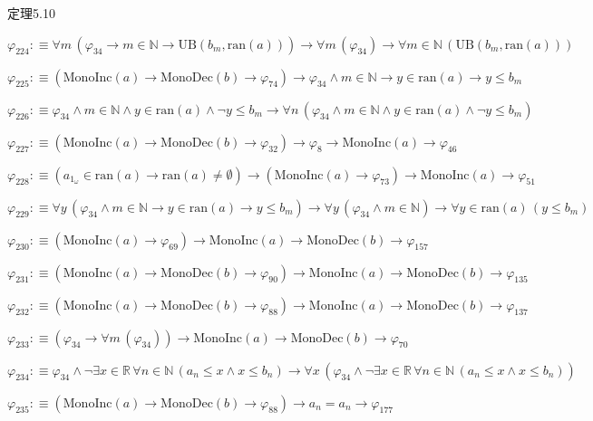 \begin{fullproof}{定理5.10}
\begin{abbrevlist}
\item $\varphi_{224} :\equiv \forall m\,(\varphi_{34} \to m \in \mathbb{N} \to \mathrm{UB}(b_{m},\mathrm{ran}(a))) \to \forall m\,(\varphi_{34}) \to \forall m \in \mathbb{N}\,(\mathrm{UB}(b_{m},\mathrm{ran}(a)))$
\item $\varphi_{225} :\equiv (\mathrm{MonoInc}(a) \to \mathrm{MonoDec}(b) \to \varphi_{74}) \to \varphi_{34} \land m \in \mathbb{N} \to y \in \mathrm{ran}(a) \to y \leq b_{m}$
\item $\varphi_{226} :\equiv \varphi_{34} \land m \in \mathbb{N} \land y \in \mathrm{ran}(a) \land \neg y \leq b_{m} \to \forall n\,(\varphi_{34} \land m \in \mathbb{N} \land y \in \mathrm{ran}(a) \land \neg y \leq b_{m})$
\item $\varphi_{227} :\equiv (\mathrm{MonoInc}(a) \to \mathrm{MonoDec}(b) \to \varphi_{32}) \to \varphi_{8} \to \mathrm{MonoInc}(a) \to \varphi_{46}$
\item $\varphi_{228} :\equiv (a_{1_{\omega}} \in \mathrm{ran}(a) \to \mathrm{ran}(a) \neq \emptyset) \to (\mathrm{MonoInc}(a) \to \varphi_{73}) \to \mathrm{MonoInc}(a) \to \varphi_{51}$
\item $\varphi_{229} :\equiv \forall y\,(\varphi_{34} \land m \in \mathbb{N} \to y \in \mathrm{ran}(a) \to y \leq b_{m}) \to \forall y\,(\varphi_{34} \land m \in \mathbb{N}) \to \forall y \in \mathrm{ran}(a)\,(y \leq b_{m})$
\item $\varphi_{230} :\equiv (\mathrm{MonoInc}(a) \to \varphi_{69}) \to \mathrm{MonoInc}(a) \to \mathrm{MonoDec}(b) \to \varphi_{157}$
\item $\varphi_{231} :\equiv (\mathrm{MonoInc}(a) \to \mathrm{MonoDec}(b) \to \varphi_{90}) \to \mathrm{MonoInc}(a) \to \mathrm{MonoDec}(b) \to \varphi_{135}$
\item $\varphi_{232} :\equiv (\mathrm{MonoInc}(a) \to \mathrm{MonoDec}(b) \to \varphi_{88}) \to \mathrm{MonoInc}(a) \to \mathrm{MonoDec}(b) \to \varphi_{137}$
\item $\varphi_{233} :\equiv (\varphi_{34} \to \forall m\,(\varphi_{34})) \to \mathrm{MonoInc}(a) \to \mathrm{MonoDec}(b) \to \varphi_{70}$
\item $\varphi_{234} :\equiv \varphi_{34} \land \neg \exists x \in \mathbb{R}\,\forall n \in \mathbb{N}\,(a_{n} \leq x \land x \leq b_{n}) \to \forall x\,(\varphi_{34} \land \neg \exists x \in \mathbb{R}\,\forall n \in \mathbb{N}\,(a_{n} \leq x \land x \leq b_{n}))$
\item $\varphi_{235} :\equiv (\mathrm{MonoInc}(a) \to \mathrm{MonoDec}(b) \to \varphi_{88}) \to a_{n} = a_{n} \to \varphi_{177}$

\end{abbrevlist}
\end{fullproof}
